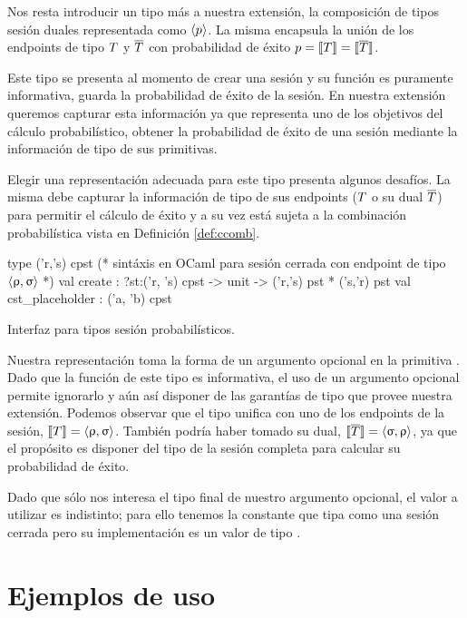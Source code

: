 Nos resta introducir un tipo más a nuestra extensión, la composición de tipos sesión duales representada como $\langle p \rangle$. La misma encapsula la
unión de los endpoints de tipo $T$ y $\overline{T}$ con probabilidad de éxito $p =
\llbracket T\rrbracket = \llbracket\overline{T}\rrbracket$. 

Este tipo se presenta al momento de crear una sesión y su función es puramente
informativa, guarda la probabilidad de éxito de la sesión. En nuestra extensión
queremos capturar esta información ya que representa uno de los objetivos del
cálculo probabilístico, obtener la probabilidad de éxito de una sesión mediante
la información de tipo de sus primitivas.

Elegir una representación adecuada para este tipo presenta algunos desafíos.
La misma debe capturar la información de tipo de sus endpoints ($T$ o su
dual $\overline{T}$) para permitir el cálculo de éxito y a su vez está sujeta a la
combinación probabilística vista en Definición \ref{def:ccomb}.

\begin{table}[htb]
	\begin{OCamlD}[frame=single]
  type ('r,'s) cpst (* sintáxis en OCaml para sesión cerrada
                     con endpoint de tipo $\langle\uprho,\upsigma\rangle$ *)
  val create  : ?st:('r, 's) cpst -> unit -> ('r,'s) pst * ('s,'r) pst
  val cst_placeholder : ('a, 'b) cpst
	\end{OCamlD}
	\caption{Interfaz \OCaml para tipos sesión probabilísticos.}
	\label{tab:create_cpst_sig}
\end{table}

Nuestra representación toma la forma de un argumento opcional en la primitiva
. Dado que la función de este tipo es informativa, el uso de un
argumento opcional permite ignorarlo y aún así disponer de las garantías de
tipo que provee nuestra extensión. Podemos observar que el tipo unifica con uno
de los endpoints de la sesión, $\llbracket T\rrbracket = \langle\uprho,\upsigma\rangle$. También
podría haber tomado su dual, $\llbracket\overline{T}\rrbracket = \langle\upsigma,\uprho\rangle$, ya que
el propósito es disponer del tipo de la sesión completa para calcular su
probabilidad de éxito.

Dado que sólo nos interesa el tipo final de nuestro argumento opcional, el
valor a utilizar es indistinto; para ello tenemos la constante
 que tipa como una sesión cerrada pero su implementación es
un valor de tipo .

\section{Ejemplos de uso}

